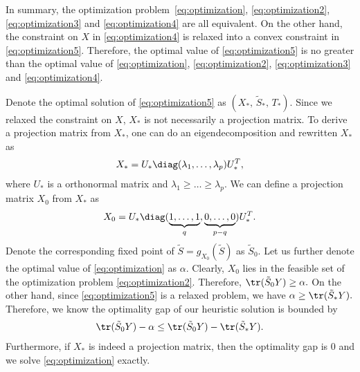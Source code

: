   \begin{remark}
    In summary, the optimization problem~\eqref{eq:optimization}, \eqref{eq:optimization2}, \eqref{eq:optimization3} and \eqref{eq:optimization4} are all equivalent. On the other hand, the constraint on $X$ in \eqref{eq:optimization4} is relaxed into a convex constraint in \eqref{eq:optimization5}. Therefore, the optimal value of \eqref{eq:optimization5} is no greater than the optimal value of \eqref{eq:optimization}, \eqref{eq:optimization2}, \eqref{eq:optimization3} and \eqref{eq:optimization4}. 
  \end{remark}
  Denote the optimal solution of \eqref{eq:optimization5} as $(X_*,\,\tilde S_*,\, T_*)$. Since we relaxed the constraint on $X$, $X_*$ is not necessarily a projection matrix. To derive a projection matrix from $X_*$, one can do an eigendecomposition and rewritten $X_*$ as
  \begin{align*}
    X_* = U_*\diag(\lambda_1,\dots,\lambda_p)U_*^T,
  \end{align*}
  where $U_*$ is a orthonormal matrix and $\lambda_1\geq \dots\geq \lambda_p$. We can define a projection matrix $X_0$ from $X_*$ as
  \begin{align*}
    X_0 = U_* \diag(\underbrace{1,\dots,1}_q,\underbrace{0,\dots,0}_{p-q})U_*^T. 
  \end{align*}
  Denote the corresponding fixed point of $\tilde S = g_{X_0}(\tilde S)$ as $\tilde S_0$. Let us further denote the optimal value of \eqref{eq:optimization} as $\alpha$. Clearly, $X_0$ lies in the feasible set of the optimization problem \eqref{eq:optimization2}. Therefore,
  $    \tr(\tilde S_0Y)\geq  \alpha.
  $  On the other hand, since \eqref{eq:optimization5} is a relaxed problem, we have
  $    \alpha \geq \tr(\tilde S_*Y). 
  $  Therefore, we know the optimality gap of our heuristic solution is bounded by
  \begin{align*}
    \tr(\tilde S_0Y) -   \alpha\leq \tr(\tilde S_0Y)-\tr(\tilde S_*Y).
  \end{align*}
  Furthermore, if $X_*$ is indeed a projection matrix, then the optimality gap is $0$ and we solve \eqref{eq:optimization} exactly.
%
